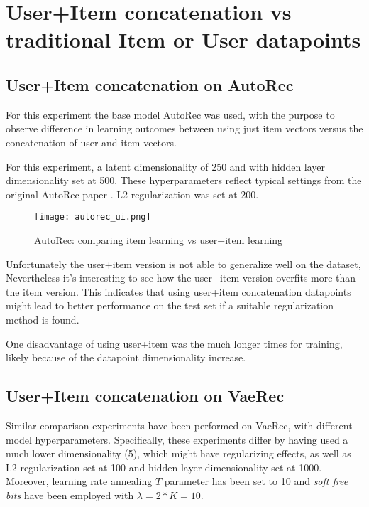 \section{User+Item concatenation vs traditional Item or User datapoints }
\subsection{User+Item concatenation on AutoRec}

For this experiment the base model AutoRec was used, with the purpose to
observe difference in learning outcomes between using just item vectors
versus the concatenation of user and item vectors.

For this experiment, a latent dimensionality of 250 and
with hidden layer dimensionality set at 500. These hyperparameters
reflect typical settings from the original AutoRec paper \cite{Sedhain2015}.
L2 regularization was set at 200.

\begin{figure}[H]
\centering
\texttt{[image: autorec\_ui.png]}
\caption{AutoRec: comparing item learning vs user+item learning}
\label{autorec_ui_fig}
\end{figure}

Unfortunately the user+item version is not able to generalize well on the dataset,
Nevertheless it's interesting to see how the user+item version overfits more than 
the item version.
This indicates that using user+item concatenation datapoints might lead to better
performance on the test set if a suitable regularization method is found.

One disadvantage of using user+item was the much longer times for training, likely
because of the datapoint dimensionality increase.

\subsection{User+Item concatenation on VaeRec}

Similar comparison experiments have been performed on VaeRec,
with different model hyperparameters.
Specifically, these experiments differ by having used a much lower dimensionality
(5), which might have regularizing effects, as well as L2 regularization set at 100
and hidden layer dimensionality set at 1000. Moreover, learning rate annealing $T$
parameter has been
set to 10 and \emph{soft free bits} have been employed with $\lambda=2*K=10$.

